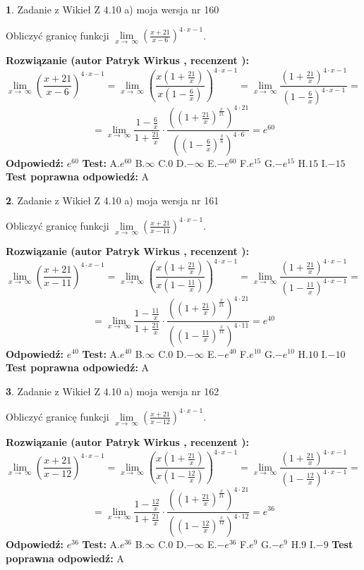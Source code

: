 \documentclass[12pt, a4paper]{article}
\theoremstyle{definition} %
\newtheorem{zad}{}
\newcommand{\zadStart}[1]{\begin{zad}#1\newline}
\newcommand{\zadStop}{\end{zad}}
\newcommand{\rozwStart}[2]{\noindent \textbf{Rozwiązanie (autor #1 , recenzent #2): }\newline}
\newcommand{\rozwStop}{\newline}
\newcommand{\odpStart}{\noindent \textbf{Odpowiedź:}\newline}
\newcommand{\odpStop}{\newline}
\newcommand{\testStart}{\noindent \textbf{Test:}\newline}
\newcommand{\testStop}{\newline}
\newcommand{\kluczStart}{\noindent \textbf{Test poprawna odpowiedź:}\newline}
\newcommand{\kluczStop}{\newline}
\begin{document}
\zadStart{Zadanie z Wikieł Z 4.10 a) moja wersja nr 160}

Obliczyć granicę funkcji  $\lim\limits_{x\to\ \infty}(\frac{x+21}{x-6})^{4\cdot x-1}$.
\zadStop
\rozwStart{Patryk Wirkus}{}
$$\lim\limits_{x\to\ \infty}(\frac{x+21}{x-6})^{4\cdot x-1} = \lim\limits_{x\to\ \infty}(\frac{x(1+\frac{21}{x})}{x(1-\frac{6}{x})})^{4\cdot x-1}=\lim\limits_{x\to\ \infty}\frac{(1+\frac{21}{x})^{4\cdot x-1}}{(1-\frac{6}{x})^{4\cdot x-1}}=$$
$$=\lim\limits_{x\to\ \infty}\frac{1-\frac{6}{x}}{1+\frac{21}{x}}\cdot\frac{((1+\frac{21}{x})^{\frac{x}{21}})^{4\cdot21}}{((1-\frac{6}{x})^{\frac{x}{6}})^{4\cdot6}}=e^{60}$$
\rozwStop
\odpStart
$e^{60}$
\odpStop
\testStart
A.$e^{60}$ B.$\infty$ C.$0$ D.$-\infty$ E.$-e^{60}$
F.$e^{15}$ G.$-e^{15}$
H.$15$
I.$-15$
\testStop
\kluczStart
A
\kluczStop



\zadStart{Zadanie z Wikieł Z 4.10 a) moja wersja nr 161}

Obliczyć granicę funkcji  $\lim\limits_{x\to\ \infty}(\frac{x+21}{x-11})^{4\cdot x-1}$.
\zadStop
\rozwStart{Patryk Wirkus}{}
$$\lim\limits_{x\to\ \infty}(\frac{x+21}{x-11})^{4\cdot x-1} = \lim\limits_{x\to\ \infty}(\frac{x(1+\frac{21}{x})}{x(1-\frac{11}{x})})^{4\cdot x-1}=\lim\limits_{x\to\ \infty}\frac{(1+\frac{21}{x})^{4\cdot x-1}}{(1-\frac{11}{x})^{4\cdot x-1}}=$$
$$=\lim\limits_{x\to\ \infty}\frac{1-\frac{11}{x}}{1+\frac{21}{x}}\cdot\frac{((1+\frac{21}{x})^{\frac{x}{21}})^{4\cdot21}}{((1-\frac{11}{x})^{\frac{x}{11}})^{4\cdot11}}=e^{40}$$
\rozwStop
\odpStart
$e^{40}$
\odpStop
\testStart
A.$e^{40}$ B.$\infty$ C.$0$ D.$-\infty$ E.$-e^{40}$
F.$e^{10}$ G.$-e^{10}$
H.$10$
I.$-10$
\testStop
\kluczStart
A
\kluczStop



\zadStart{Zadanie z Wikieł Z 4.10 a) moja wersja nr 162}

Obliczyć granicę funkcji  $\lim\limits_{x\to\ \infty}(\frac{x+21}{x-12})^{4\cdot x-1}$.
\zadStop
\rozwStart{Patryk Wirkus}{}
$$\lim\limits_{x\to\ \infty}(\frac{x+21}{x-12})^{4\cdot x-1} = \lim\limits_{x\to\ \infty}(\frac{x(1+\frac{21}{x})}{x(1-\frac{12}{x})})^{4\cdot x-1}=\lim\limits_{x\to\ \infty}\frac{(1+\frac{21}{x})^{4\cdot x-1}}{(1-\frac{12}{x})^{4\cdot x-1}}=$$
$$=\lim\limits_{x\to\ \infty}\frac{1-\frac{12}{x}}{1+\frac{21}{x}}\cdot\frac{((1+\frac{21}{x})^{\frac{x}{21}})^{4\cdot21}}{((1-\frac{12}{x})^{\frac{x}{12}})^{4\cdot12}}=e^{36}$$
\rozwStop
\odpStart
$e^{36}$
\odpStop
\testStart
A.$e^{36}$ B.$\infty$ C.$0$ D.$-\infty$ E.$-e^{36}$
F.$e^{9}$ G.$-e^{9}$
H.$9$
I.$-9$
\testStop
\kluczStart
A
\kluczStop
\end{document}
